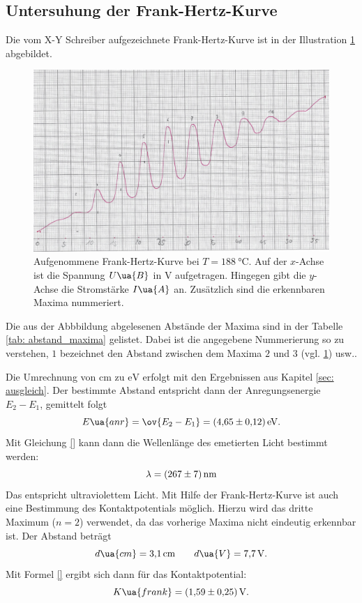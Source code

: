 \subsection{Untersuhung der Frank-Hertz-Kurve}\label{sec: frank}
\FloatBarrier
Die vom X-Y Schreiber aufgezeichnete Frank-Hertz-Kurve ist in der Illustration \ref{fig: messkurve_frank_hertz} abgebildet.
\begin{figure}
  \centering
  \includegraphics[width=0.8 \textwidth]{./pics/frank_hertz_kurve.png}
  \caption{Aufgenommene Frank-Hertz-Kurve bei $T=\SI{188}{\celsius}$. Auf der $x$-Achse ist die Spannung $U\ua{B}$ in $\si{\volt}$ aufgetragen.
          Hingegen gibt die $y$-Achse die Stromstärke $I\ua{A}$ an. Zusätzlich sind die erkennbaren Maxima nummeriert.}
  \label{fig: messkurve_frank_hertz}
\end{figure}
Die aus der Abbbildung abgelesenen Abstände der Maxima sind in der Tabelle \ref{tab: abstand_maxima} gelistet.
Dabei ist die angegebene Nummerierung so zu verstehen, $1$ bezeichnet den Abstand zwischen dem Maxima $2$ und $3$ (vgl. \ref{fig: messkurve_frank_hertz}) usw..

Die Umrechnung von $\si{\centi\meter}$ zu $\si{\eV}$ erfolgt mit den Ergebnissen aus Kapitel \ref{sec: ausgleich}.
Der bestimmte Abstand entspricht dann der Anregungsenergie $E_2-E_1$, gemittelt folgt
\begin{equation}
  \label{eq:austrittarbeit}
E\ua{anr}=\ov{E_2-E_1}=\SI{4.65\pm0.12}{\eV}.
\end{equation}
Mit Gleichung \eqref{} kann dann die Wellenlänge des emetierten Licht bestimmt werden:
\begin{equation}
  \label{eq: lambda}
  \lambda=\SI{267\pm7}{\nano\meter}
\end{equation}
Das entspricht ultraviolettem Licht.
Mit Hilfe der Frank-Hertz-Kurve ist auch eine Bestimmung des Kontaktpotentials
möglich. Hierzu wird das dritte Maximum ($n=2$) verwendet, da das vorherige Maxima
nicht eindeutig erkennbar ist. Der Abstand beträgt
\begin{equation*}
  d\ua{cm}=\SI{3.1}{\centi\meter} \qquad d\ua{V}=\SI{7.7}{\volt}.
\end{equation*}
Mit Formel \eqref{} ergibt sich dann für das Kontaktpotential:
\begin{equation}
  \label{eq:k_frank}
  K\ua{frank}= \SI{1.59\pm0.25}{\volt}.
\end{equation}
\FloatBarrier
